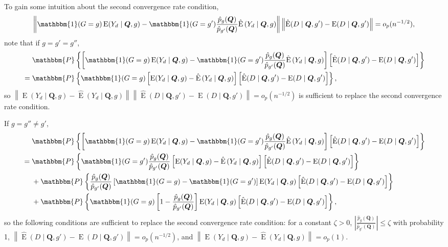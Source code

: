 \documentclass[12pt,a4paper]{article}
\newcommand{\E}{\operatorname{E}}
\def\Q{{\boldsymbol Q}}
\def\one{\mathbbm{1}}
\def\P{\mathbbm{P}}
\begin{document}
To gain some intuition about the second convergence rate condition, $$\left\| \one(G=g) \E(Y_d \mid \Q,g) - \one(G=g') \frac{\hat{p}_{g}(\Q)}{\hat{p}_{g'}(\Q)} \hat{\E}\left( Y_d \mid \Q, g \right) \right\| \left\| \hat{\E}(D \mid \Q, g') - \E(D \mid \Q, g') \right\|=o_p(n^{-1/2}),$$ note that 
if $g=g'=g''$,
\begin{align*}
    &\phantom{{}={}} \P\left\{ \left[ \one(G=g) \E(Y_d \mid \Q,g) - \one(G=g') \frac{\hat{p}_{g}(\Q)}{\hat{p}_{g'}(\Q)} \hat{\E}\left( Y_d \mid \Q, g \right) \right] \left[ \hat{\E}(D \mid \Q, g') - \E(D \mid \Q, g') \right] \right\} \\
    &=  \P\left\{ \one(G=g) \left[ \E(Y_d \mid \Q,g) - \hat{\E}\left( Y_d \mid \Q, g \right) \right] \left[ \hat{\E}(D \mid \Q, g') - \E(D \mid \Q, g') \right] \right\},
\end{align*}
so $\left\| \E(Y_d \mid \Q,g) - \hat{\E}\left( Y_d \mid \Q, g \right)  \right\| \left\| \hat{\E}(D \mid \Q, g') - \E(D \mid \Q, g')  \right\| = o_p(n^{-1/2})$ is sufficient to replace the second convergence rate condition. 

If $g= g'' \neq g'$,
\begin{align*}
    &\phantom{{}={}} \P\left\{ \left[ \one(G=g) \E(Y_d \mid \Q,g) - \one(G=g') \frac{\hat{p}_{g}(\Q)}{\hat{p}_{g'}(\Q)} \hat{\E}\left( Y_d \mid \Q, g \right) \right] \left[ \hat{\E}(D \mid \Q, g') - \E(D \mid \Q, g') \right] \right\} \\
    &= \P \left\{ \one(G=g')\frac{\hat{p}_g(\Q)}{\hat{p}_{g'}(\Q)} \left[ \E(Y_d \mid \Q,g) - \hat{\E}\left( Y_d \mid \Q, g \right) \right] \left[ \hat{\E}(D \mid \Q, g') - \E(D \mid \Q, g') \right] \right\} \\
    &\phantom{{}={}} +  
    \P \left\{ \frac{\hat{p}_g(\Q)}{\hat{p}_{g'}(\Q)} \left[\one(G=g)-\one(G=g')\right] \E(Y_d \mid \Q,g) \left[ \hat{\E}(D \mid \Q, g') - \E(D \mid \Q, g') \right] \right\} \\
    &\phantom{{}={}} + \P \left\{ \one(G=g) \left[ 1-\frac{\hat{p}_g(\Q)}{\hat{p}_{g'}(\Q)} \right] \E(Y_d \mid \Q,g) \left[ \hat{\E}(D \mid \Q, g') - \E(D \mid \Q, g') \right] \right\} ,
\end{align*}
so the following conditions are sufficient to replace the second convergence rate condition: for a constant $\zeta>0$, $\left| \frac{\hat{p}_g(\Q)}{\hat{p}_{g'}(\Q)} \right| \leq \zeta$ with probability 1, $\left\| \hat{\E}(D \mid \Q, g') - \E(D \mid \Q, g') \right\|=o_p(n^{-1/2})$, and $\left\| \E(Y_d \mid \Q,g) - \hat{\E}\left( Y_d \mid \Q, g \right) \right\|=o_p(1)$. 
\end{document}
